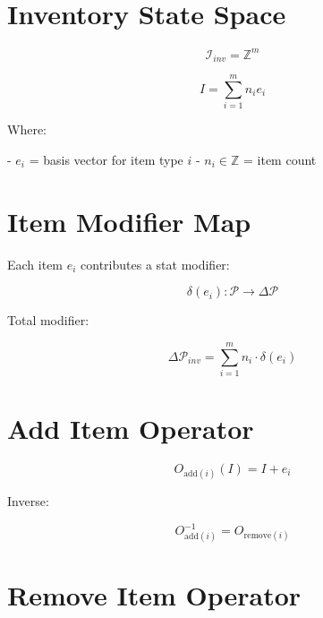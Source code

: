 
\section*{Inventory State Space}

\[
\mathcal{I}_{inv} = \mathbb{Z}^m
\]

\[
I = \sum_{i=1}^{m} n_i e_i
\]

Where:

- \(e_i\) = basis vector for item type \(i\)  
- \(n_i \in \mathbb{Z}\) = item count  


\section*{Item Modifier Map}

Each item \(e_i\) contributes a stat modifier:

\[
\delta(e_i) : \mathcal{P} \to \Delta\mathcal{P}
\]

Total modifier:

\[
\Delta\mathcal{P}_{inv}
= \sum_{i=1}^{m} n_i \cdot \delta(e_i)
\]


\section*{Add Item Operator}

\[
O_{\text{add}(i)}(I)
= I + e_i
\]

Inverse:

\[
O_{\text{add}(i)}^{-1}
= O_{\text{remove}(i)}
\]


\section*{Remove Item Operator}

